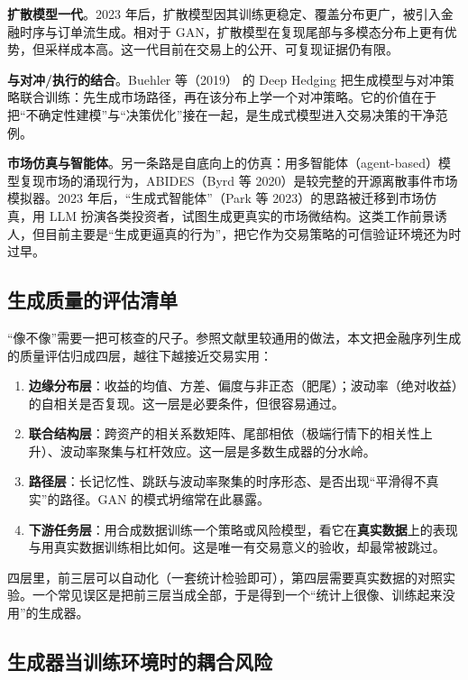\textbf{扩散模型一代}。2023 年后，扩散模型因其训练更稳定、覆盖分布更广，被引入金融时序与订单流生成。相对于 GAN，扩散模型在复现尾部与多模态分布上更有优势，但采样成本高。这一代目前在交易上的公开、可复现证据仍有限。

\textbf{与对冲/执行的结合}。Buehler 等（2019）\cite{buehler2019deephedging} 的 Deep Hedging 把生成模型与对冲策略联合训练：先生成市场路径，再在该分布上学一个对冲策略。它的价值在于把“不确定性建模”与“决策优化”接在一起，是生成式模型进入交易决策的干净范例。

\textbf{市场仿真与智能体}。另一条路是自底向上的仿真：用多智能体（agent-based）模型复现市场的涌现行为，ABIDES（Byrd 等 2020\cite{byrd2020abides}）是较完整的开源离散事件市场模拟器。2023 年后，“生成式智能体”（Park 等 2023\cite{park2023generative}）的思路被迁移到市场仿真，用 LLM 扮演各类投资者，试图生成更真实的市场微结构。这类工作前景诱人，但目前主要是“生成更逼真的行为”，把它作为交易策略的可信验证环境还为时过早。

\subsection{生成质量的评估清单}

“像不像”需要一把可核查的尺子。参照文献里较通用的做法，本文把金融序列生成的质量评估归成四层，越往下越接近交易实用：

\begin{enumerate}
  \item \textbf{边缘分布层}：收益的均值、方差、偏度与非正态（肥尾）；波动率（绝对收益）的自相关是否复现。这一层是必要条件，但很容易通过。
  \item \textbf{联合结构层}：跨资产的相关系数矩阵、尾部相依（极端行情下的相关性上升）、波动率聚集与杠杆效应。这一层是多数生成器的分水岭。
  \item \textbf{路径层}：长记忆性、跳跃与波动率聚集的时序形态、是否出现“平滑得不真实”的路径。GAN 的模式坍缩常在此暴露。
  \item \textbf{下游任务层}：用合成数据训练一个策略或风险模型，看它在\textbf{真实数据}上的表现与用真实数据训练相比如何。这是唯一有交易意义的验收，却最常被跳过。
\end{enumerate}

四层里，前三层可以自动化（一套统计检验即可），第四层需要真实数据的对照实验。一个常见误区是把前三层当成全部，于是得到一个“统计上很像、训练起来没用”的生成器。

\subsection{生成器当训练环境时的耦合风险}

